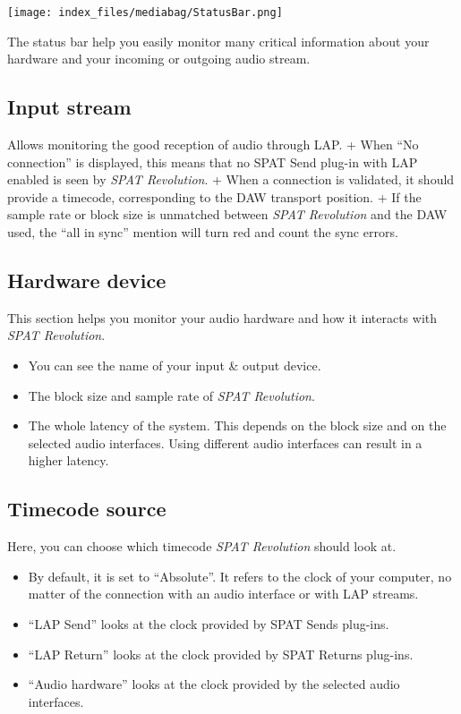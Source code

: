 \documentclass[
  letterpaper,
  DIV=11,
  numbers=noendperiod]{scrreport}
\providecommand{\tightlist}{%
  \setlength{\itemsep}{0pt}\setlength{\parskip}{0pt}}\usepackage{longtable,booktabs,array}
\begin{document}
\texttt{[image: index\_files/mediabag/StatusBar.png]}

The status bar help you easily monitor many critical information about
your hardware and your incoming or outgoing audio stream.

\hypertarget{input-stream}{%
\subsection{Input stream}\label{input-stream}}

Allows monitoring the good reception of audio through LAP. + When ``No
connection'' is displayed, this means that no SPAT Send plug-in with LAP
enabled is seen by \emph{SPAT Revolution}. + When a connection is
validated, it should provide a timecode, corresponding to the DAW
transport position. + If the sample rate or block size is unmatched
between \emph{SPAT Revolution} and the DAW used, the ``all in sync''
mention will turn red and count the sync errors.

\hypertarget{hardware-device}{%
\subsection{Hardware device}\label{hardware-device}}

This section helps you monitor your audio hardware and how it interacts
with \emph{SPAT Revolution}.

\begin{itemize}
\tightlist
\item
  You can see the name of your input \& output device.
\item
  The block size and sample rate of \emph{SPAT Revolution}.
\item
  The whole latency of the system. This depends on the block size and on
  the selected audio interfaces. Using different audio interfaces can
  result in a higher latency.
\end{itemize}

\hypertarget{timecode-source}{%
\subsection{Timecode source}\label{timecode-source}}

Here, you can choose which timecode \emph{SPAT Revolution} should look
at.

\begin{itemize}
\tightlist
\item
  By default, it is set to ``Absolute''. It refers to the clock of your
  computer, no matter of the connection with an audio interface or with
  LAP streams.
\item
  ``LAP Send'' looks at the clock provided by SPAT Sends plug-ins.
\item
  ``LAP Return'' looks at the clock provided by SPAT Returns plug-ins.
\item
  ``Audio hardware'' looks at the clock provided by the selected audio
  interfaces.
\end{itemize}
\end{document}
